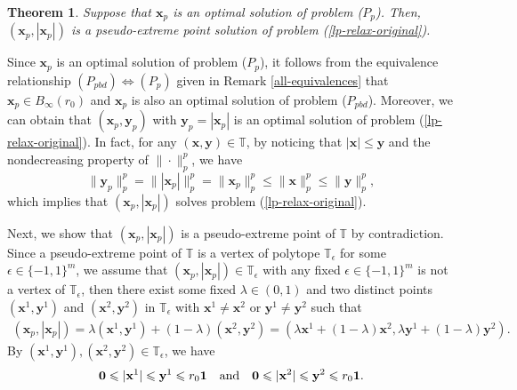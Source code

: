 \documentclass[12pt]{article}
\newtheorem{Theorem}{Theorem}[part]
\begin{document}
\begin{Theorem}\label{Pp-solution-is-extreme-point-solution-T}
Suppose that $\mathbf{x}_p$ is an optimal solution of problem {\rm($P_p$)}. Then, $(\mathbf{x}_p,|\mathbf{x}_p|)$ is a pseudo-extreme point solution of problem {\rm (\ref{lp-relax-original})}.
\end{Theorem}

Since $\mathbf{x}_p$ is an optimal solution of problem {\rm($P_p$)}, it follows from the equivalence relationship $(P_{pbd})\Leftrightarrow(P_{p})$ given in Remark \ref{all-equivalences} that $\mathbf{x}_p\in B_\infty(r_0)$ and $\mathbf{x}_p$ is also an optimal solution of problem {\rm($P_{pbd}$)}. Moreover, we can obtain that $(\mathbf{x}_p,\mathbf{y}_p)$ with $\mathbf{y}_p=|\mathbf{x}_p|$ is an optimal solution of problem {\rm (\ref{lp-relax-original})}. In fact, for any $(\mathbf{x},\mathbf{y})\in\mathbb{T}$, by noticing that $|\mathbf{x}|\leqslant\mathbf{y}$ and the nondecreasing property of $\|\cdot\|_{p}^{p}$, we have
$$
\|\mathbf{y}_p\|_{p}^{p}=\||\mathbf{x}_p|\|_{p}^{p} =\|\mathbf{x}_p\|_{p}^{p}\leqslant\|\mathbf{x}\|^{p}_{p}\leqslant\|\mathbf{y}\|^{p}_{p},
$$
which implies that $(\mathbf{x}_p,|\mathbf{x}_p|)$ solves problem {\rm (\ref{lp-relax-original})}.

Next, we show that $(\mathbf{x}_p,|\mathbf{x}_p|)$ is a pseudo-extreme point of $\mathbb{T}$ by contradiction.
Since a pseudo-extreme point of $\mathbb{T}$ is a vertex  of polytope $\mathbb{T}_\epsilon$ for some $\epsilon\in\{-1,1\}^m$, we assume that $(\mathbf{x}_p,|\mathbf{x}_p|)\in\mathbb{T}_\epsilon$ with any fixed $\epsilon\in\{-1,1\}^m$ is not a vertex of $\mathbb{T}_\epsilon$, then there exist some fixed $\lambda\in(0,1)$ and two distinct points $(\mathbf{x}^1, \mathbf{y}^1)$ and $(\mathbf{x}^2, \mathbf{y}^2)$ in $\mathbb{T}_\epsilon$ with $\mathbf{x}^1\neq\mathbf{x}^2$ or $\mathbf{y}^1\neq\mathbf{y}^2$ such that
\begin{eqnarray}\label{convex-combination}
(\mathbf{x}_p,|\mathbf{x}_p|)
=\lambda(\mathbf{x}^1, \mathbf{y}^1)+(1-\lambda)(\mathbf{x}^2, \mathbf{y}^2)
=\left(\lambda\mathbf{x}^1+(1-\lambda)\mathbf{x}^2,\lambda\mathbf{y}^1+(1-\lambda)\mathbf{y}^2\right).
\end{eqnarray}
By $(\mathbf{x}^1, \mathbf{y}^1),(\mathbf{x}^2, \mathbf{y}^2)\in \mathbb{T}_\epsilon$, we have
\begin{eqnarray}\label{inter-result-1}
\mathbf{0}\leqslant|\mathbf{x}^1|\leqslant\mathbf{y}^1\leqslant r_0\mathbf{1}\quad \mbox{\rm and}\quad \mathbf{0}\leqslant|\mathbf{x}^2|\leqslant\mathbf{y}^2\leqslant r_0\mathbf{1}.
\end{eqnarray}
\end{document}
